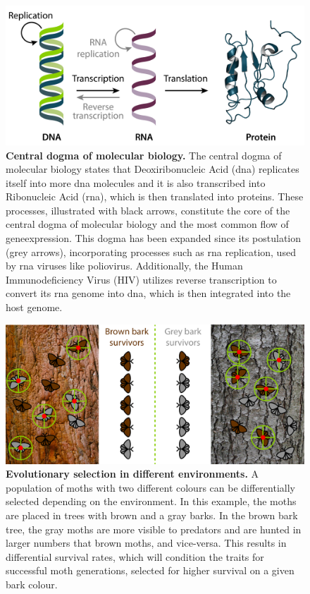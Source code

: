 \begin{figure}[tbh]
    \centering
    \includegraphics[width=1\linewidth]{figures/central_dogma.pdf}
    \caption{\textbf{Central dogma of molecular biology.} The central dogma of molecular biology states that Deoxiribonucleic Acid (\gls{dna}) replicates itself into more \gls{dna} molecules and it is also transcribed into Ribonucleic Acid (\gls{rna}), which is then translated into proteins. These processes, illustrated with black arrows, constitute the core of the central dogma of molecular biology and the most common flow of \gls{geneexpression}. This dogma has been expanded since its postulation (grey arrows), incorporating processes such as \gls{rna} replication, used by \gls{rna} viruses like poliovirus. Additionally, the Human Immunodeficiency Virus (HIV) utilizes reverse transcription to convert its \gls{rna} genome into \gls{dna}, which is then integrated into the host genome.}
    \label{fig:chapter1:central_dogma}
\end{figure}

\begin{figure}[tbh]
    \centering
    \includegraphics[width=1\linewidth]{figures/evolution_selection.pdf}
    \caption{\textbf{Evolutionary selection in different environments.} A population of moths with two different colours can be differentially selected depending on the environment. In this example, the moths are placed in trees with brown and a gray barks. In the brown bark tree, the gray moths are more visible to predators and are hunted in larger numbers that brown moths, and vice-versa. This results in differential survival rates, which will condition the traits for successful moth generations, selected for higher survival on a given bark colour.}
    \label{fig:chapter1:selection}
\end{figure}


